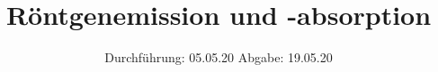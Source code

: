 

\subject{V602}
\title{Röntgenemission und -absorption}
\date{%
  Durchführung: 05.05.20
  \hspace{3em}
  Abgabe: 19.05.20
}



\maketitle
\thispagestyle{empty}
\tableofcontents
\newpage








\printbibliography{}


